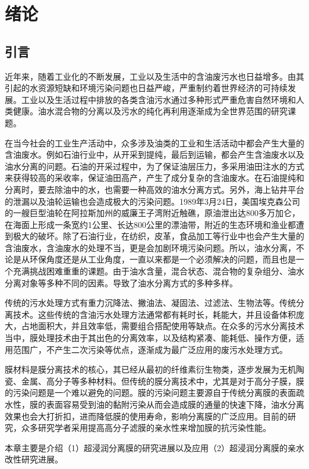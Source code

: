 \chapter{绪论}
\section{引言}
近年来，随着工业化的不断发展，工业以及生活中的含油废污水也日益增多。由其引起的水资源短缺和环境污染问题也日益严峻，严重制约着世界经济的可持续发展。工业以及生活过程中排放的各类含油污水通过多种形式严重危害自然环境和人类健康。油水混合物的分离以及污水的纯化再利用逐渐成为全世界范围的研究课题。

在当今社会的工业生产活动中，众多涉及油类的工业和生活活动中都会产生大量的含油废水。例如石油行业中，从开采到提纯，最后到运输，都会产生含油废水以及油水分离的问题。石油的开采过程中，为了保证油层压力，多采用油田注水的方式来获得较高的采收率，保证油田高产，产生了成分复杂的含油废水。在石油提纯和分离时，要去除油中的水，也需要一种高效的油水分离方式。另外，海上钻井平台的泄漏以及油轮运输也会造成极大的污染问题。1989年3月24日，美国埃克森公司的一艘巨型油轮在阿拉斯加州的威廉王子湾附近触礁，原油泄出达800多万加仑，在海面上形成一条宽约1公里、长达800公里的漂油带，附近的生态环境和渔业都遭到极大的破坏。除了石油行业，在纺织，皮革，食品加工等行业中也会产生大量的含油废水，含油废水的处理不当，更是会加剧环境污染问题。所以，油水分离，不论是从环保角度还是从工业角度，一直以来都是一个必须解决的问题，而且也是一个充满挑战困难重重的课题。由于油水含量，混合状态、混合物的复杂组分、油水分离对象等多种不同的因素。导致了油水分离方式的多种多样。

传统的污水处理方式有重力沉降法、撇油法、凝固法、过滤法、生物法等。传统分离技术。这些传统的含油污水处理方法通常都有耗时长，耗能大，并且设备体积庞大，占地面积大，并且效率低，需要组合搭配使用等缺点。在众多的污水分离技术当中，膜处理技术由于其出色的分离效率，以及结构紧凑、能耗低、操作方便，适用范围广，不产生二次污染等优点，逐渐成为最广泛应用的废污水处理方式。

膜材料是膜分离技术的核心，其已经从最初的纤维素衍生物类，逐步发展为无机陶瓷、金属、高分子等多种材料。但传统的膜分离技术中，尤其是对于高分子膜，膜的污染问题是一个难以避免的问题。膜的污染问题主要源自于传统分离膜的表面疏水性，膜的表面容易受到油的黏附污染从而会造成膜的通量的快速下降，油水分离效果也会大打折扣，进而降低膜的使用寿命，影响分离膜的广泛应用。目前的研究，众多研究学者采用提高高分子滤膜的亲水性来增加膜的抗污染性能。\par 本章主要是介绍（1）超浸润分离膜的研究进展以及应用（2）超浸润分离膜的亲水改性研究进展。

